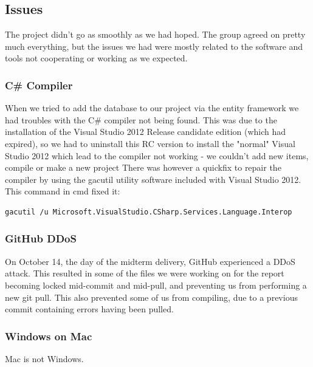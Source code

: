 \subsection{Issues}
The project didn't go as smoothly as we had hoped. The group agreed on pretty much everything, but the issues we had were mostly related to the software and tools not cooperating or working as we expected.

\subsubsection{C\# Compiler}
When we tried to add the database to our project via the entity framework we had troubles with the C\# compiler not being found. This was due to the installation of the Visual Studio 2012 Release candidate edition (which had expired), so we had to uninstall this RC version to install the "normal" Visual Studio 2012 which lead to the compiler not working - we couldn't add new items, compile or make a new project
There was however a quickfix to repair the compiler by using the gacutil utility software included with Visual Studio 2012.
This command in cmd fixed it:
\begin{verbatim}
gacutil /u Microsoft.VisualStudio.CSharp.Services.Language.Interop 
\end{verbatim}

\subsubsection{GitHub DDoS}
On October 14, the day of the midterm delivery, GitHub experienced a DDoS attack. This resulted in some of the files we were working on for the report becoming locked mid-commit and mid-pull, and preventing us from performing a new git pull. This also prevented some of us from compiling, due to a previous commit containing errors having been pulled.

\subsubsection{Windows on Mac}
Mac is not Windows. %

